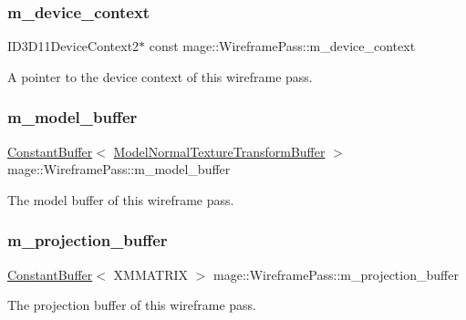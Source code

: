 \subsubsection{\texorpdfstring{m\+\_\+device\+\_\+context}{m\_device\_context}}
{\footnotesize\ttfamily I\+D3\+D11\+Device\+Context2$\ast$ const mage\+::\+Wireframe\+Pass\+::m\+\_\+device\+\_\+context\hspace{0.3cm}{\ttfamily [private]}}

A pointer to the device context of this wireframe pass. \hypertarget{classmage_1_1_wireframe_pass_aa7fb7cbba08fe8b4d7defab36d2e82a7}{}\label{classmage_1_1_wireframe_pass_aa7fb7cbba08fe8b4d7defab36d2e82a7} 
\subsubsection{\texorpdfstring{m\+\_\+model\+\_\+buffer}{m\_model\_buffer}}
{\footnotesize\ttfamily \hyperlink{structmage_1_1_constant_buffer}{Constant\+Buffer}$<$ \hyperlink{structmage_1_1_model_normal_texture_transform_buffer}{Model\+Normal\+Texture\+Transform\+Buffer} $>$ mage\+::\+Wireframe\+Pass\+::m\+\_\+model\+\_\+buffer\hspace{0.3cm}{\ttfamily [private]}}

The model buffer of this wireframe pass. \hypertarget{classmage_1_1_wireframe_pass_a4079c5e719beac17ef87356d3e5c322a}{}\label{classmage_1_1_wireframe_pass_a4079c5e719beac17ef87356d3e5c322a} 
\subsubsection{\texorpdfstring{m\+\_\+projection\+\_\+buffer}{m\_projection\_buffer}}
{\footnotesize\ttfamily \hyperlink{structmage_1_1_constant_buffer}{Constant\+Buffer}$<$ X\+M\+M\+A\+T\+R\+IX $>$ mage\+::\+Wireframe\+Pass\+::m\+\_\+projection\+\_\+buffer\hspace{0.3cm}{\ttfamily [private]}}

The projection buffer of this wireframe pass. \hypertarget{classmage_1_1_wireframe_pass_a39577f12ad9b3f72e703c290cbf46002}{}\label{classmage_1_1_wireframe_pass_a39577f12ad9b3f72e703c290cbf46002} 
